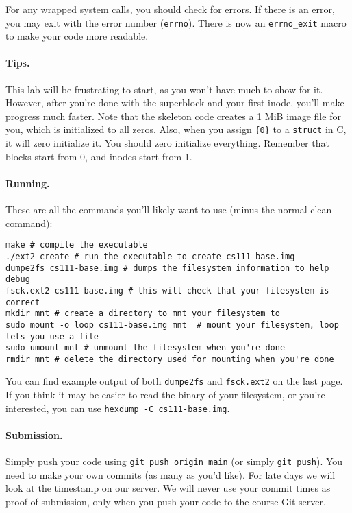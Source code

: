 For any wrapped system calls, you should check for errors.
If there is an error, you may exit with the error number (\texttt{errno}).
There is now an \texttt{errno\_exit} macro to make your code more readable.

\paragraph{Tips.}

This lab will be frustrating to start, as you won't have much to show for it.
However, after you're done with the superblock and your first inode, you'll
make progress much faster.
Note that the skeleton code creates a 1 MiB image file for you, which is
initialized to all zeros.
Also, when you assign \texttt{\{0\}} to a \texttt{struct} in C, it will
zero initialize it.
You should zero initialize everything.
Remember that blocks start from 0, and inodes start from 1.

\paragraph{Running.}

These are all the commands you'll likely want to use (minus the normal
clean command):

\begin{lstlisting}
make # compile the executable
./ext2-create # run the executable to create cs111-base.img
dumpe2fs cs111-base.img # dumps the filesystem information to help debug
fsck.ext2 cs111-base.img # this will check that your filesystem is correct
mkdir mnt # create a directory to mnt your filesystem to
sudo mount -o loop cs111-base.img mnt  # mount your filesystem, loop lets you use a file
sudo umount mnt # unmount the filesystem when you're done
rmdir mnt # delete the directory used for mounting when you're done
\end{lstlisting}

You can find example output of both \lstinline|dumpe2fs| and
\lstinline|fsck.ext2| on the last page.
If you think it may be easier to read the binary of your filesystem, or
you're interested, you can use \lstinline|hexdump -C cs111-base.img|.

\paragraph{Submission.}

Simply push your code using \lstinline|git push origin main| (or simply
\lstinline|git push|).
You need to make your own commits (as many as you'd like).
For late days we will look at the timestamp on our server.
We will never use your commit times as proof of submission, only when you
push your code to the course Git server.

